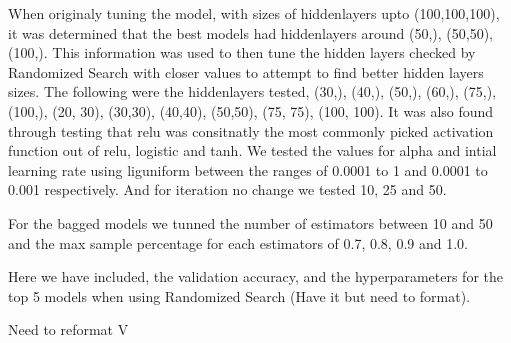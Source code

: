 When originaly tuning the model, with sizes of hiddenlayers upto (100,100,100), it was determined that the best models had hiddenlayers
around (50,), (50,50), (100,). This information was used to then tune the hidden layers checked by Randomized Search with closer values
to attempt to find better hidden layers sizes.
The following were the hiddenlayers tested,
(30,), (40,), (50,), (60,), (75,), (100,), (20, 30), (30,30), (40,40), (50,50), (75, 75), (100, 100).
It was also found through testing that relu was consitnatly the most commonly picked activation function out of relu, logistic and tanh.
We tested the values for alpha and intial learning rate using liguniform between the ranges of 0.0001 to 1 and 0.0001 to 0.001 respectively.
And for iteration no change we tested 10, 25 and 50.

For the bagged models we tunned the number of estimators between 10 and 50 and the max sample percentage for each estimators of 0.7, 0.8, 0.9 and 1.0.

Here we have included, the validation accuracy, and the hyperparameters for the top 5 models when using Randomized Search (Have it but need to format).


Need to reformat V

